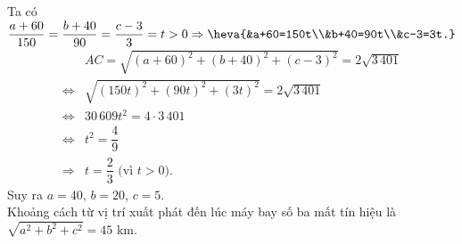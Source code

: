 \begin{ex}
{		Ta có $\dfrac{a+60}{150}=\dfrac{b+40}{90}=\dfrac{c-3}{3}=t>0\Rightarrow \heva{&a+60=150t\\&b+40=90t\\&c-3=3t.}$
		\allowdisplaybreaks
		\begin{align*}
			&A C=\sqrt{(a+60)^2+(b+40)^2+(c-3)^2}=2 \sqrt{3\,401}\\
			\Leftrightarrow &\sqrt{(150 t)^2+(90 t)^2+(3 t)^2}=2 \sqrt{3\,401} \\
			\Leftrightarrow &30\,609 t^2=4 \cdot 3\,401\\
			\Leftrightarrow & t^2=\dfrac{4}{9} \\
			\Rightarrow &t=\dfrac{2}{3} \text{ (vì $t>0$)}.
		\end{align*}
		Suy ra $a=40$, $b=20$, $c=5$.\\
		Khoảng cách từ vị trí xuất phát đến lúc máy bay số ba mất tín hiệu là $\sqrt{a^2+b^2+c^2}=45$ km.
		
	}
\end{ex}

